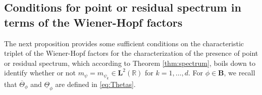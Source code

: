 \documentclass[12pt]{amsart}
\numberwithin{equation}{section}
\newcommand{\bb}{\mathbb}
\newcommand{\ov}{\overline}
\newcommand{\bmrm}[2][2]{\mathbf{#2}^{#1}}
\newcommand{\B}{\mathbf{B}}
\theoremstyle{definition}
\theoremstyle{assump}
\theoremstyle{remark}
\begin{document}
\subsection{Conditions for point or residual spectrum in terms of the Wiener-Hopf factors}
The next proposition provides some sufficient conditions on the characteristic triplet of the Wiener-Hopf factors for the characterization of the presence of point or residual spectrum, which according to Theorem \ref{thm:spectrum}, boils down to identify whether or not $m_{\psi}=m_{\psi_k} \in \bmrm{L}(\bb{R})$ for  $k=1, \ldots,d$.  For $\phi\in\B$, we recall that $\ov{\Theta}_{\phi}$ and  $\underline{\Theta}_{\phi}$ are defined  in \eqref{eq:Thetas}.
\end{document}
